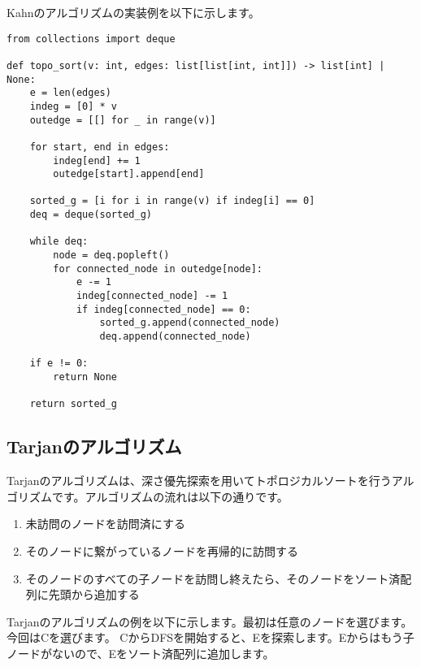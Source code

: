 \vspace{0.5cm}

Kahnのアルゴリズムの実装例を以下に示します。
\begin{lstlisting}[caption=Kahnのアルゴリズムの実装, label=kahn, frame=TRBL, label={kahn}]
from collections import deque

def topo_sort(v: int, edges: list[list[int, int]]) -> list[int] | None:
    e = len(edges)
    indeg = [0] * v
    outedge = [[] for _ in range(v)]
    
    for start, end in edges:
        indeg[end] += 1
        outedge[start].append[end]
    
    sorted_g = [i for i in range(v) if indeg[i] == 0]
    deq = deque(sorted_g)
    
    while deq:
        node = deq.popleft()
        for connected_node in outedge[node]:
            e -= 1
            indeg[connected_node] -= 1
            if indeg[connected_node] == 0: 
                sorted_g.append(connected_node)
                deq.append(connected_node)
    
    if e != 0:
        return None
    
    return sorted_g
\end{lstlisting}

\subsection{Tarjanのアルゴリズム}
Tarjanのアルゴリズムは、深さ優先探索を用いてトポロジカルソートを行うアルゴリズムです。アルゴリズムの流れは以下の通りです。

\begin{enumerate}
  \item 未訪問のノードを訪問済にする
  \item そのノードに繋がっているノードを再帰的に訪問する
  \item そのノードのすべての子ノードを訪問し終えたら、そのノードをソート済配列に先頭から追加する
\end{enumerate}

\newpage

Tarjanのアルゴリズムの例を以下に示します。最初は任意のノードを選びます。今回はCを選びます。
CからDFSを開始すると、Eを探索します。Eからはもう子ノードがないので、Eをソート済配列に追加します。

\vspace{0.5cm}

\begin{center}
\end{center}

